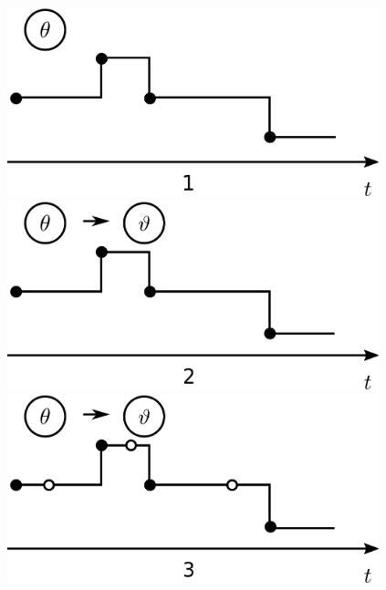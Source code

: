 \setlength{\unitlength}{0.8cm}
  \begin{figure}[h!]
  \centering
  \begin{minipage}[!hp]{0.32\linewidth}
  \centering
    \includegraphics [width=0.96\textwidth, angle=0]{figs/plot0.pdf}
      \end{minipage}
  \begin{minipage}[hp]{0.32\linewidth}
  \centering
    \includegraphics [width=0.96\textwidth, angle=0]{figs/plot1.pdf}
    \vspace{-0 in}
  \end{minipage}
  \begin{minipage}[hp]{0.32\linewidth}
  \centering
    \includegraphics [width=0.96\textwidth, angle=0]{figs/plot2.pdf}

\end{minipage}
\end{figure}
